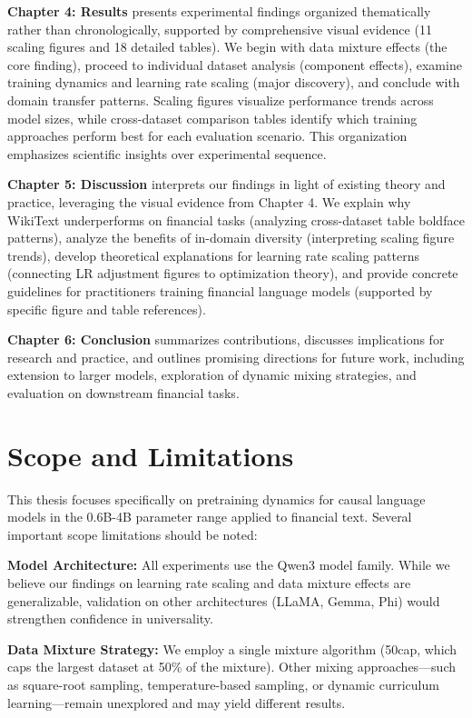 \textbf{Chapter 4: Results} presents experimental findings organized thematically rather than chronologically, supported by comprehensive visual evidence (11 scaling figures and 18 detailed tables). We begin with data mixture effects (the core finding), proceed to individual dataset analysis (component effects), examine training dynamics and learning rate scaling (major discovery), and conclude with domain transfer patterns. Scaling figures visualize performance trends across model sizes, while cross-dataset comparison tables identify which training approaches perform best for each evaluation scenario. This organization emphasizes scientific insights over experimental sequence.

\textbf{Chapter 5: Discussion} interprets our findings in light of existing theory and practice, leveraging the visual evidence from Chapter 4. We explain why WikiText underperforms on financial tasks (analyzing cross-dataset table boldface patterns), analyze the benefits of in-domain diversity (interpreting scaling figure trends), develop theoretical explanations for learning rate scaling patterns (connecting LR adjustment figures to optimization theory), and provide concrete guidelines for practitioners training financial language models (supported by specific figure and table references).

\textbf{Chapter 6: Conclusion} summarizes contributions, discusses implications for research and practice, and outlines promising directions for future work, including extension to larger models, exploration of dynamic mixing strategies, and evaluation on downstream financial tasks.

\section{Scope and Limitations}

This thesis focuses specifically on pretraining dynamics for causal language models in the 0.6B-4B parameter range applied to financial text. Several important scope limitations should be noted:

\textbf{Model Architecture:} All experiments use the Qwen3 model family. While we believe our findings on learning rate scaling and data mixture effects are generalizable, validation on other architectures (LLaMA, Gemma, Phi) would strengthen confidence in universality.

\textbf{Data Mixture Strategy:} We employ a single mixture algorithm (50cap, which caps the largest dataset at 50\% of the mixture). Other mixing approaches—such as square-root sampling, temperature-based sampling, or dynamic curriculum learning—remain unexplored and may yield different results.

